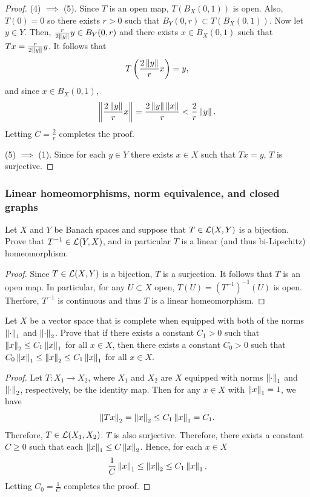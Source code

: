 \documentclass[a4paper]{article}
\begin{document}
\begin{proof}
  (4) $\implies$ (5). Since $T$ is an open map, $T(B_X(0, 1))$ is 
  open. Also, $T(0) = 0$ so there exists $r > 0$ such that 
  $B_Y(0, r) \subset T(B_X(0, 1))$. Now let $y \in Y$. Then, 
  $\frac{r}{2 \left\lVert y\right\rVert} y \in B_Y(0, r)$ and there exists 
  $x \in B_X(0, 1)$ such that $Tx = \frac{r}{2 \left\lVert y\right\rVert} y$. 
  It follows that 
  \[
  T \left( \frac{2\left\lVert y\right\rVert}{r} x \right) = y,
  \]
  and since $x \in B_X(0, 1)$,
  \[
  \left\lVert \frac{2 \left\lVert y\right\rVert}{r} x\right\rVert = \frac{2 \left\lVert y\right\rVert \left\lVert x\right\rVert}{r}
  < \frac{2}{r} \left\lVert y\right\rVert.
  \]
  Letting $C = \frac{2}{r}$ completes the proof.

  (5) $\implies$ (1). Since for each $y \in Y$ there exists 
  $x \in X$ such that $T x = y$, $T$ is surjective.

\end{proof}

\subsubsection*{Linear homeomorphisms, norm equivalence, 
and closed graphs}
\begin{thm}
  Let $X$ and $Y$ be Banach spaces and suppose that 
  $T \in \mathcal{L}(X,Y)$ is a bijection.  Prove that $T^{-1} 
  \in \mathcal{L}(Y,X)$, and in particular $T$ is a linear 
  (and thus bi-Lipschitz) homeomorphism.
\end{thm}

\begin{proof}
  Since $T \in \mathcal{L}(X, Y)$ is a bijection, $T$ is a surjection. 
  It follows that $T$ is an open map. In particular, for any 
  $U \subset X$ open, $T(U) = (T^{-1})^{-1}(U)$ is open. Therfore,
  $T^{-1}$ is continuous and thus $T$ is a linear homeomorphism.

\end{proof}

\begin{thm}
Let $X$ be a vector space that is complete when equipped 
with both of the norms $\left\lVert \cdot\right\rVert_1$ and 
$\left\lVert \cdot\right\rVert_2$.  Prove that if there exists a constant 
$C_1>0$ such that $\left\lVert x\right\rVert_2 \le C_1 \left\lVert x\right\rVert_1$ for all 
$x \in X$, then there exists a constant $C_0 >0$ such that 
$C_0 \left\lVert x\right\rVert_1 \le \left\lVert x\right\rVert_2 \le C_1 \left\lVert x\right\rVert_1$ for all 
$x \in X$.    
\end{thm}

\begin{proof}
Let $T: X_1 \to X_2$, where $X_1$ and $X_2$
are $X$ equipped with norms $\left\lVert \cdot\right\rVert_1$ and $\left\lVert \cdot\right\rVert_2$,
respectively, be the identity map. Then for any $x \in X$ 
with $\left\lVert x\right\rVert_1 = 1$, we have 
\[
\left\lVert T x\right\rVert_2 = \left\lVert x\right\rVert_2 \leq C_1 \left\lVert x\right\rVert_1 = C_1.
\]
Therefore, $T \in \mathcal{L}(X_1, X_2)$. $T$ is also surjective.
Therefore, there exists a constant $C \geq 0$ such that 
each $\left\lVert x\right\rVert_1 \leq C \left\lVert x\right\rVert_2$. Hence, for each 
$x \in X$
\[
\frac{1}{C} \left\lVert x\right\rVert_1 \leq \left\lVert x\right\rVert_2 \leq C_1 \left\lVert x\right\rVert_1.
\]
Letting $C_0 = \frac{1}{C}$ completes the proof.

\end{proof}
\end{document}
